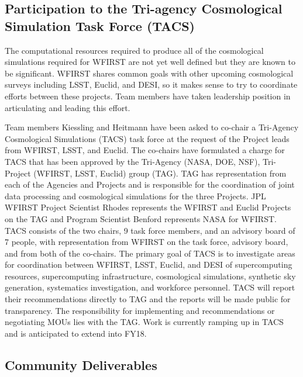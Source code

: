 \subsection{Participation to the Tri-agency  Cosmological Simulation Task Force (TACS)}

The computational resources required to produce all of the cosmological simulations required for WFIRST are not yet well defined but they are known to be significant. WFIRST shares common goals with other upcoming cosmological surveys including LSST, Euclid, and DESI, so it makes sense to try to coordinate efforts between these projects. Team members have taken leadership position in articulating and leading this effort.

Team members Kiessling and Heitmann have been asked to co-chair a Tri-Agency Cosmological Simulations (TACS) task force at the request of the Project leads from WFIRST, LSST, and Euclid. The co-chairs have formulated a charge for TACS that has been approved by the Tri-Agency (NASA, DOE, NSF), Tri-Project (WFIRST, LSST, Euclid) group (TAG). TAG has representation from each of the Agencies and Projects and is responsible for the coordination of joint data processing and cosmological simulations for the three Projects. JPL WFIRST Project Scientist Rhodes represents the WFIRST and Euclid Projects on the TAG and Program Scientist Benford represents NASA for WFIRST. TACS consists of the two chairs, 9 task force members, and an advisory board of 7 people, with representation from WFIRST on the task force, advisory board, and from both of the co-chairs. The primary goal of TACS is to investigate areas for coordination between WFIRST, LSST, Euclid, and DESI of supercomputing resources, supercomputing infrastructure, cosmological simulations, synthetic sky generation, systematics investigation, and workforce personnel. TACS will report their recommendations directly to TAG and the reports will be made public for transparency. The responsibility for implementing and recommendations or negotiating MOUs lies with the TAG. Work is currently ramping up in TACS and is anticipated to extend into FY18.


\subsection{Community Deliverables}

